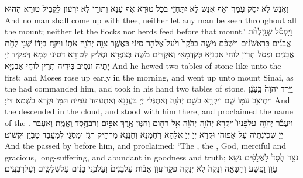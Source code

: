 {וַאֲנָשׁ לָא יִסַּק עִמָּךְ וְאַף אֶנָשׁ לָא יִתַּחְזֵי בְּכָל טוּרָא אַף עָנָא וְתוֹרֵי לָא יִרְעוֹן לָקֳבֵיל טוּרָא הַהוּא׃}
{And no man shall come up with thee, neither let any man be seen throughout all the mount; neither let the flocks nor herds feed before that mount.’}{}
{וַיִּפְסֹ֡ל שְׁנֵֽי\maqqaf לֻחֹ֨ת אֲבָנִ֜ים כָּרִאשֹׁנִ֗ים וַיַּשְׁכֵּ֨ם מֹשֶׁ֤ה בַבֹּ֙קֶר֙ וַיַּ֙עַל֙ אֶל\maqqaf הַ֣ר סִינַ֔י כַּאֲשֶׁ֛ר צִוָּ֥ה יְהֹוָ֖ה אֹת֑וֹ וַיִּקַּ֣ח בְּיָד֔וֹ שְׁנֵ֖י לֻחֹ֥ת אֲבָנִֽים׃}
{וּפְסַל תְּרֵין לוּחֵי אַבְנַיָּא כְּקַדְמָאֵי וְאַקְדֵּים מֹשֶׁה בְּצַפְרָא וּסְלֵיק לְטוּרָא דְּסִינַי כְּמָא דְּפַקֵּיד יְיָ יָתֵיהּ וּנְסֵיב בִּידֵיהּ תְּרֵין לוּחֵי אַבְנַיָּא׃}
{And he hewed two tables of stone like unto the first; and Moses rose up early in the morning, and went up unto mount Sinai, as the \lord\space had commanded him, and took in his hand two tables of stone.}{}
{וַיֵּ֤רֶד יְהֹוָה֙ בֶּֽעָנָ֔ן וַיִּתְיַצֵּ֥ב עִמּ֖וֹ שָׁ֑ם וַיִּקְרָ֥א בְשֵׁ֖ם יְהֹוָֽה׃}
{וְאִתְגְּלִי יְיָ בַּעֲנָנָא וְאִתְעַתַּד עִמֵּיהּ תַּמָּן וּקְרָא בִשְׁמָא דַּייָ׃}
{And the \lord\space descended in the cloud, and stood with him there, and proclaimed the name of the \lord.}{}
{וַיַּעֲבֹ֨ר יְהֹוָ֥ה \pasek  עַל\maqqaf פָּנָיו֮ וַיִּקְרָא֒ יְהֹוָ֣ה \pasek  יְהֹוָ֔ה אֵ֥ל רַח֖וּם וְחַנּ֑וּן אֶ֥רֶךְ אַפַּ֖יִם וְרַב\maqqaf חֶ֥סֶד וֶאֱמֶֽת׃}
{וְאַעְבַּר יְיָ שְׁכִינְתֵיהּ עַל אַפּוֹהִי וּקְרָא יְיָ יְיָ אֱלָהָא רַחְמָנָא וְחַנָּנָא מַרְחֵיק רְגַז וּמַסְגֵּי לְמֶעֱבַד טָבְוָן וּקְשׁוֹט׃}
{And the \lord\space passed by before him, and proclaimed: ‘The \lord, the \lord, God, merciful and gracious, long-suffering, and abundant in goodness and truth;}{}
{\large נֹ\normalsize צֵ֥ר חֶ֙סֶד֙ לָאֲלָפִ֔ים נֹשֵׂ֥א עָוֺ֛ן וָפֶ֖שַׁע וְחַטָּאָ֑ה וְנַקֵּה֙ לֹ֣א יְנַקֶּ֔ה פֹּקֵ֣ד \legarmeh  עֲוֺ֣ן אָב֗וֹת עַל\maqqaf בָּנִים֙ וְעַל\maqqaf בְּנֵ֣י בָנִ֔ים עַל\maqqaf שִׁלֵּשִׁ֖ים וְעַל\maqqaf רִבֵּעִֽים׃}
